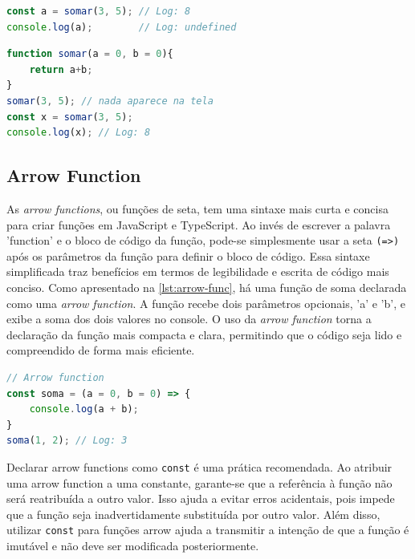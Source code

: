 \Needspace{0.3\textheight}
\begin{lstlisting}[language=TypeScript, caption=Evidenciando Retorno da Função., label=lst:func-return]
const a = somar(3, 5); // Log: 8
console.log(a);        // Log: undefined
\end{lstlisting}

\begin{lstlisting}[language=TypeScript, caption=Exemplo de Retorno de Função., label=lst:ex-return-func]
function somar(a = 0, b = 0){
    return a+b;
}
somar(3, 5); // nada aparece na tela
const x = somar(3, 5);
console.log(x); // Log: 8
\end{lstlisting}

\subsection{Arrow Function}

As \textit{arrow functions}, ou funções de seta, tem uma sintaxe mais curta e concisa para criar funções em JavaScript e TypeScript. Ao invés de escrever a palavra 'function' e o bloco de código da função, pode-se simplesmente usar a seta  \verb|(=>)| após os parâmetros da função para definir o bloco de código. Essa sintaxe simplificada traz benefícios em termos de legibilidade e escrita de código mais conciso. Como apresentado na \autoref{lst:arrow-func}, há uma função de soma declarada como uma \textit{arrow function}. A função recebe dois parâmetros opcionais, 'a' e 'b', e exibe a soma dos dois valores no console. O uso da \textit{arrow function} torna a declaração da função mais compacta e clara, permitindo que o código seja lido e compreendido de forma mais eficiente.

\begin{lstlisting}[language=TypeScript, caption=Exemplo de Arrow Function., label=lst:arrow-func]
// Arrow function
const soma = (a = 0, b = 0) => {
    console.log(a + b);
}    
soma(1, 2); // Log: 3
\end{lstlisting}

Declarar arrow functions como \texttt{const} é uma prática recomendada. Ao atribuir uma arrow function a uma constante, garante-se que a referência à função não será reatribuída a outro valor. Isso ajuda a evitar erros acidentais, pois impede que a função seja inadvertidamente substituída por outro valor. Além disso, utilizar \texttt{const} para funções arrow ajuda a transmitir a intenção de que a função é imutável e não deve ser modificada posteriormente.



